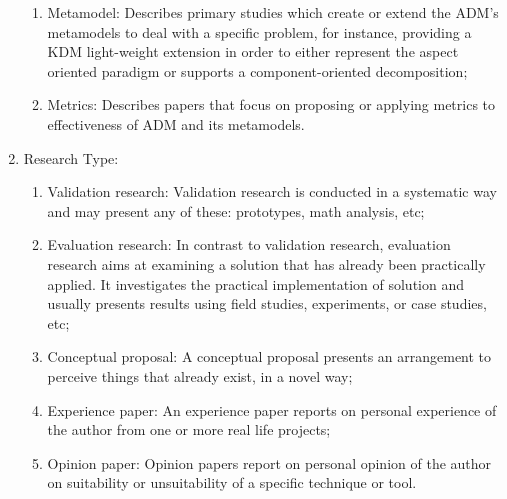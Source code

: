 \begin{enumerate}
\begin{enumerate}
\item Metamodel: Describes primary studies which create or extend the ADM's metamodels to deal with a specific problem, for instance, providing a KDM light-weight extension in order to either represent the aspect oriented paradigm or supports a component-oriented decomposition;

\item Metrics: Describes papers that focus on proposing or applying metrics to effectiveness of ADM and its metamodels.

\end{enumerate}

\item Research Type:

\begin{enumerate}

\item Validation research: Validation research is conducted in a systematic way and may present any of these: prototypes, math analysis, etc;

\item Evaluation research: In contrast to validation research, evaluation research aims at examining a solution that has already been practically applied. It investigates the practical implementation of solution and usually presents results using field studies, experiments, or case studies, etc;

\item Conceptual proposal: A conceptual proposal presents an arrangement to perceive things that already exist, in a novel way;

\item Experience paper: An experience paper reports on personal experience of the author from one or more real life projects;

\item Opinion paper:  Opinion papers report on personal opinion of the author on suitability or unsuitability of a specific technique or tool.

\end{enumerate}

\end{enumerate}